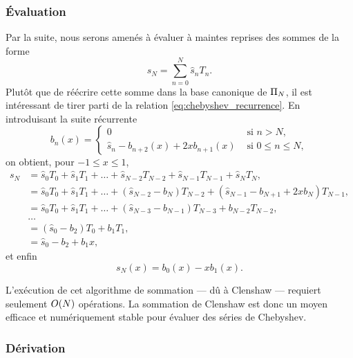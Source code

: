 \subsubsection{Évaluation}
Par la suite, nous serons amenés à évaluer à maintes reprises des sommes de la forme
\begin{equation}
	s_N = \sum_{n=0}^N \hat{s}_n T_n.
	\label{eq:chebyshev_sum}
\end{equation}
Plutôt que de réécrire cette somme dans la base canonique de $\Pi_{N}$, il est intéressant de tirer parti de la relation \eqref{eq:chebyshev_recurrence}. 
En introduisant la suite récurrente
\begin{equation}
	b_n(x) = 
	\begin{cases}
	 0 & \text{\ si\ } n > N,   \\ 
	 \hat{s}_n - b_{n+2}(x) + 2x b_{n+1}(x) & \text{\ si\ } 0 \leq n \leq N,
	\end{cases}
\end{equation}
on obtient, pour $-1 \leq x \leq 1$,%
\def\px{}%
\begin{align*}
	s_N\px 
	&= \hat{s}_0 T_0\px + \hat{s}_1 T_1\px + \ldots + \hat{s}_{N-2} T_{N-2}\px + \hat{s}_{N-1} T_{N-1}\px + \hat{s}_N T_N\px, \\
	&= \hat{s}_0 T_0 \px
	+ \hat{s}_1 T_1 \px
	+ \ldots 
	+ \left(\hat{s}_{N-2} - b_{N}\px\right) T_{N-2} \px
	+ \left(\hat{s}_{N-1} - b_{N+1}\px + 2x b_{N}\px \right) T_{N-1}\px, \\
	&= \hat{s}_0 T_0 \px
	+ \hat{s}_1 T_1 \px
	+ \ldots 
	+ \left(\hat{s}_{N-3} - b_{N-1}\px\right) T_{N-3} \px
	+ b_{N-2}\px T_{N-2}\px, \\
	& \ldots\\
	&= \left( \hat{s}_0 - b_2\px \right) T_0\px + b_1\px T_1\px, \\
	&= \hat{s}_0 - b_2\px + b_1\px x,
\end{align*}
et enfin
\begin{equation}
	s_N(x) = b_0(x) - x b_1(x).
\end{equation}

L'exécution de cet algorithme de sommation --- dû à Clenshaw \cite{clenshaw1955} --- requiert seulement $O\!\left( {N} \right)$ opérations. %
La sommation de Clenshaw est donc un moyen efficace et numériquement stable pour évaluer des séries de Chebyshev.


\subsubsection{Dérivation}


